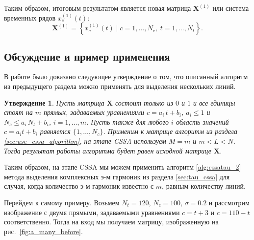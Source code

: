 \documentclass[specialist,
               substylefile = spbu.rtx,
               subf,href,colorlinks=true, 12pt]{disser}
\newtheorem{Th}{Утверждение}
\begin{document}
\begin{enumerate}
Таким образом, итоговым результатом является новая матрица $\mathbf{X}^{(1)}$ или система временных рядов $x_c^{(1)}(t)$:
\begin{equation*}
    \mathbf{X}^{(1)}=\left\{x_c^{(1)}(t) \; | \; c=1, \ldots, N_c, \; t=1, \ldots, N_t\right\}.
\end{equation*}
\end{enumerate}

\subsection{Обсуждение и пример применения}
В работе \cite{Zhornikova2016} было доказано следующее утверждение о том, что описанный алгоритм из предыдущего раздела можно применять для выделения нескольких линий.

\begin{Th} \cite[Утверждение 20]{Zhornikova2016}
Пусть матрица $\mathbf{X}$ состоит только из $0$ и $1$ и все единицы стоят на $m$ прямых, задаваемых уравнениями $c = a_i\,t + b_i$,  $a_i \leqslant 1$ и $N_c \leqslant a_i\,N_t + b_i$, $i=1,\ldots,m$. Пусть также для любого $i$
область значений $c = a_i t + b_i$ равняется $\{1,\ldots,N_c\}$.
Применим к матрице алгоритм из раздела \ref{sec:use_cssa_algorithm}, на этапе CSSA используем $M = m$ и $m<L<N$. Тогда результат работы алгоритма будет равен исходной матрице $\mathbf{X}$.
\end{Th}

Таким образом, на этапе CSSA мы можем применить алгоритм \ref{alg:cssatau_2} метода выделения комплексных э-м гармоник из раздела \ref{sec:tau_cssa} для случая, когда количество э-м гармоник известно с $m$, равным количеству линий.

Перейдем к самому примеру.
Возьмем $N_t = 120$, $N_c = 100$, $\sigma = 0.2$ и рассмотрим изображение с двумя прямыми, задаваемыми уравнениями $c = t + 3$ и $c = 110 - t$ соответственно. Тогда на вход мы получаем матрицу, изображенную на рис.~\ref{fig:a_many_before}.
\end{document}

